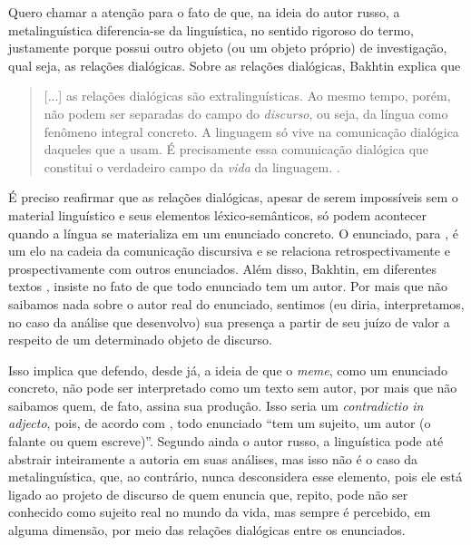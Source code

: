 \documentclass[portuguese]{textolivre}
\begin{document}
Quero chamar a atenção para o fato de que, na ideia do autor russo, a metalinguística diferencia-se da linguística, no sentido rigoroso do termo, justamente porque possui outro objeto (ou um objeto próprio) de investigação, qual seja, as relações dialógicas. Sobre as relações dialógicas, Bakhtin explica que

\begin{quote}    
 [...] as relações dialógicas são extralinguísticas. Ao mesmo tempo, porém, não podem ser separadas do campo do \textit{discurso}, ou seja, da língua como fenômeno integral concreto. A linguagem só vive na comunicação dialógica daqueles que a usam. É precisamente essa comunicação dialógica que constitui o verdadeiro campo da \textit{vida} da linguagem. \cite[p.~209, grifos no original]{bakhtin2018problemas}.	
\end{quote}

	
	
É preciso reafirmar que as relações dialógicas, apesar de serem impossíveis sem o material linguístico e seus elementos léxico-semânticos, só podem acontecer quando a língua se materializa em um enunciado concreto. O enunciado, para \textcite{bakhtin2016generos}, é um elo na cadeia da comunicação discursiva e se relaciona retrospectivamente e prospectivamente com outros enunciados. Além disso, Bakhtin, em diferentes textos \cite{bakhtin2016generos, bakhtin2018problemas}, insiste no fato de que todo enunciado tem um autor. Por mais que não saibamos nada sobre o autor real do enunciado, sentimos (eu diria, interpretamos, no caso da análise que desenvolvo) sua presença a partir de seu juízo de valor a respeito de um determinado objeto de discurso.
	
Isso implica que defendo, desde já, a ideia de que o \textit{meme}, como um enunciado concreto, não pode ser interpretado como um texto sem autor, por mais que não saibamos quem, de fato, assina sua produção. Isso seria um \textit{contradictio in adjecto}, pois, de acordo com \textcite[p.~72]{bakhtin2016generos}, todo enunciado “tem um sujeito, um autor (o falante ou quem escreve)”. Segundo ainda o autor russo, a linguística pode até abstrair inteiramente a autoria em suas análises, mas isso não é o caso da metalinguística, que, ao contrário, nunca desconsidera esse elemento, pois ele está ligado ao projeto de discurso de quem enuncia que, repito, pode não ser conhecido como sujeito real no mundo da vida, mas sempre é percebido, em alguma dimensão, por meio das relações dialógicas entre os enunciados.
	
\end{document}
